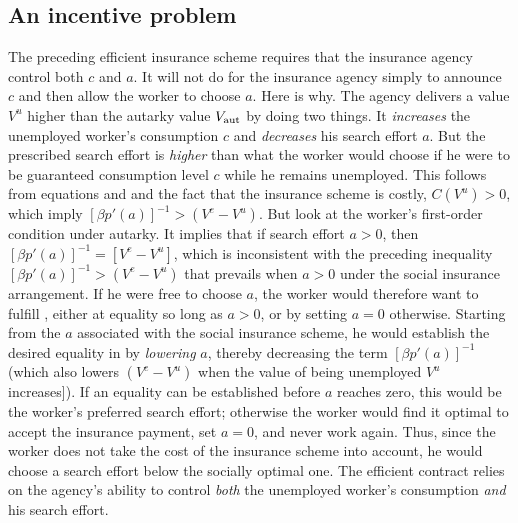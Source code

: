 \subsection{An incentive problem}
 The preceding efficient insurance scheme requires that the insurance agency
control both $c$ and $a$.  It will not do for the insurance agency
simply to announce $c$ and then allow the worker to choose $a$.
Here is why.
The  agency delivers a value $V^u$  higher than
the autarky value $V_{\rm aut}$ by doing two things.   It
{\it increases\/}
the unemployed worker's consumption $c$ and {\it decreases\/} his search
effort $a$. But the prescribed
search effort is {\it higher\/} than what the worker would choose
if he were to be guaranteed consumption level $c$ while he
remains unemployed.
This follows from equations  and  and the
fact that the insurance scheme is costly, $C(V^u)>0$, which imply
$[ \beta p'(a) ]^{-1} > (V^e - V^u)$.
 But look at the worker's
first-order condition  under autarky.
It implies that if search effort $a>0$, then
$[\beta p'(a)]^{-1} = [V^e - V^u]$, which is inconsistent
with the preceding inequality
$[ \beta p'(a) ]^{-1} > (V^e - V^u)$ that prevails when $a >0$ under
the social
insurance arrangement.
If he were free to choose $a$, the worker would therefore want to
fulfill , either at equality so long as $a >0$, or by setting
$a=0$ otherwise.  Starting from the  $a$ associated with
the social insurance scheme,
he  would establish the desired equality
in  by {\it lowering\/} $a$, thereby decreasing
the term $[ \beta p'(a) ]^{-1}$ (which also lowers $(V^e - V^u)$
when the value of being
unemployed $V^u$ increases]). If an equality can be established before
$a$ reaches zero, this would be the worker's preferred search effort;
otherwise the worker would find it optimal to accept the insurance
payment, set $a=0$,  and  never work again.
Thus, since the worker does not take the
cost of the insurance scheme into account, he would choose a search
effort below the socially optimal one. The efficient contract
relies on  the agency's ability to control {\it both\/} the unemployed
worker's consumption {\it and\/} his search effort.

